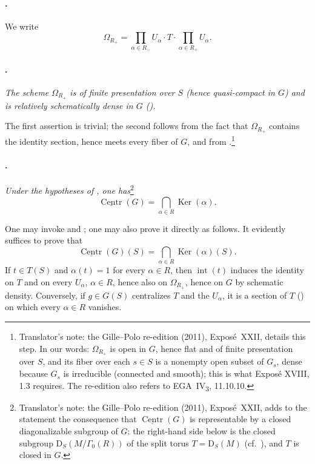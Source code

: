 \paragraph{.}
We write
\[
  \Omega_{R_+}
  =
  \prod_{\alpha\in R_-}U_\alpha
  \mathbin{\cdot}T\mathbin{\cdot}
  \prod_{\alpha\in R_+}U_\alpha.
\]

\paragraph{.}
\textit{The scheme \(\Omega_{R_+}\) is of finite presentation over
\(S\) \textup{(hence quasi-compact in \(G\))} and is relatively
schematically dense in \(G\)
\textup{()}.}

The first assertion is trivial; the second follows from the fact
that \(\Omega_{R_+}\) contains the identity section, hence meets every
fiber of \(G\), and from .\footnote{Translator's note: the Gille--Polo re-edition (2011), Exposé~XXII,
details this step. In our words: \(\Omega_{R_+}\) is open in \(G\), hence flat
and of finite presentation over \(S\), and its fiber over each \(s\in S\) is a
nonempty open subset of \(G_s\), dense because \(G_s\) is irreducible
(connected and smooth); this is what Exposé XVIII, 1.3 requires. The
re-edition also refers to EGA~IV\textsubscript{3}, 11.10.10.}

\paragraph{.}
\textit{Under the hypotheses of , one has}\footnote{Translator's note: the Gille--Polo re-edition (2011), Exposé~XXII, adds to the
statement the consequence that \(\underline{\operatorname{Centr}}(G)\) is
representable by a closed diagonalizable subgroup of \(G\): the right-hand
side below is the closed subgroup \(\mathrm D_S(M/\Gamma_0(R))\) of the split
torus \(T=\mathrm D_S(M)\) (cf.\ ), and \(T\) is closed in \(G\).}
\[
  \underline{\operatorname{Centr}}(G)
  =
  \bigcap_{\alpha\in R}\operatorname{Ker}(\alpha).
\]

One may invoke  and ; one may also prove
it directly as follows. It evidently suffices to prove that
\[
  \underline{\operatorname{Centr}}(G)(S)
  =
  \bigcap_{\alpha\in R}\operatorname{Ker}(\alpha)(S).
\]
If \(t\in T(S)\) and \(\alpha(t)=1\) for every \(\alpha\in R\), then
\(\operatorname{int}(t)\) induces the identity on \(T\) and on every
\(U_\alpha\), \(\alpha\in R\), hence also on \(\Omega_{R_+}\), hence
on \(G\) by schematic density. Conversely, if \(g\in G(S)\)
centralizes \(T\) and the \(U_\alpha\), it is a section of \(T\)
\textup{()} on which every \(\alpha\in R\)
vanishes.


